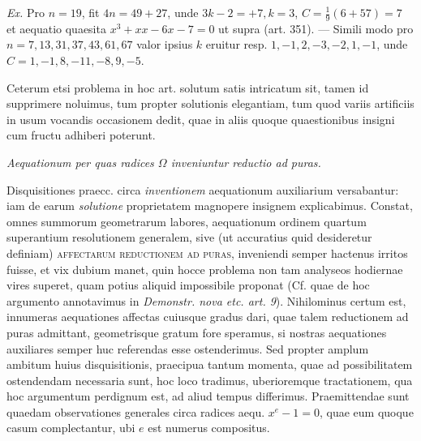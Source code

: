 \textit{Ex.} Pro \(n=19\), fit \(4n=49+27\), unde \(3k-2=+7,\allowbreak k=3\), \(C=\frac19(6+57)=7\) et aequatio quaesita \(x^3+xx-6x-7=0\) ut supra (art. 351). — Simili modo pro \(n=7,\allowbreak 13,\allowbreak 31,\allowbreak 37,\allowbreak 43,\allowbreak 61,\allowbreak 67\) valor ipsius \(k\) eruitur resp. \(1,\allowbreak -1,\allowbreak 2,\allowbreak -3,\allowbreak -2,\allowbreak 1,\allowbreak -1\), unde \(C=1,\allowbreak -1,\allowbreak 8,\allowbreak -11,\allowbreak -8,\allowbreak 9,\allowbreak -5\).

Ceterum etsi problema in hoc art. solutum satis intricatum sit, tamen id supprimere noluimus, tum propter solutionis elegantiam, tum quod variis artificiis in usum vocandis occasionem dedit, quae in aliis quoque quaestionibus insigni cum fructu adhiberi poterunt.

\begin{center}\itshape \textit{Aequationum per quas radices \(\Omega\) inveniuntur reductio ad puras.}\end{center}


Disquisitiones praecc. circa \textit{inventionem} aequationum auxiliarium versabantur: iam de earum \textit{solutione} proprietatem magnopere insignem explicabimus. Constat, omnes summorum geometrarum labores, aequationum ordinem quartum superantium resolutionem generalem, sive (ut accuratius quid desideretur definiam) \textsc{affectarum reductionem ad puras}, inveniendi semper hactenus irritos fuisse, et vix dubium manet, quin hocce problema non tam analyseos hodiernae vires superet, quam potius aliquid impossibile proponat (Cf. quae de hoc argumento annotavimus in \textit{Demonstr. nova etc. art. 9}). Nihilominus certum est, innumeras aequationes affectas cuiusque gradus dari, quae talem reductionem ad puras admittant, geometrisque gratum fore speramus, si nostras aequationes auxiliares semper huc referendas esse ostenderimus. Sed propter amplum ambitum huius disquisitionis,
praecipua tantum momenta, quae ad possibilitatem ostendendam necessaria sunt, hoc loco tradimus, uberioremque tractationem, qua hoc argumentum perdignum est, ad aliud tempus differimus. Praemittendae sunt quaedam observationes generales circa radices aequ. \(x^e-1=0\), quae eum quoque casum complectantur, ubi \(e\) est numerus compositus.

